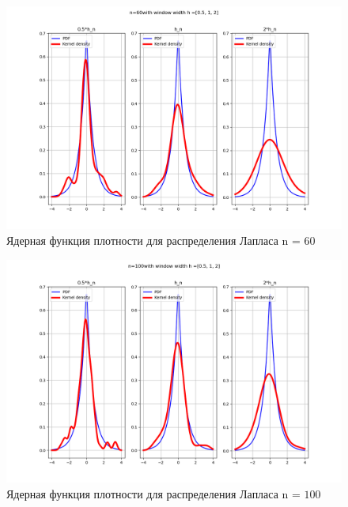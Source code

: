 \documentclass[a4]{article}
\begin{document}
\begin{center}
	\begin{figure}[H]
		\caption{Ядерная функция плотности для распределения Лапласа n = $60$ }
		\includegraphics[width=\textwidth]{Lab4_laplace_pdf_60.png} 
	\end{figure}
	
	\begin{figure}[H]
		\caption{Ядерная функция плотности для распределения Лапласа n = $100$ }
		\includegraphics[width=\textwidth]{Lab4_laplace_pdf_100.png} 
	\end{figure}
	

\end{center}
\end{document}
